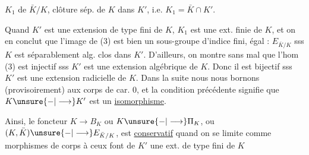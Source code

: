 $K_1$ de $\bar K/K$, clôture  sép. de $K$ dans $K'$, i.e. $K_1=\bar K\cap K'$.

Quand $K'$ est une extension de type fini de $K$, $K_1$ est une ext. finie de $K$, et on en conclut que l'image de (3) est bien un sous-groupe d'indice fini, égal : $E_{\bar K/K}$ sss  $K$ est séparablement alg. clos dans $K'$. D'ailleurs, on montre sans mal que  l'hom (3) est injectif sss $K'$ est une extension algébrique de $K$. Donc il est bijectif sss $K'$ est une extension radicielle de $K$. Dans la suite nous nous bornons (provisoirement) aux corps de car. $0$, et la condition précédente signifie  que $K\unsure{-|\longrightarrow}K'$ est un \uline{isomorphisme}.

Ainsi, le foncteur $K\longrightarrow B_K$ ou $K\unsure{-|\longrightarrow}\Pi_K$, ou $(K,\bar K)\unsure{-|\longrightarrow}E_{\bar K/K}$, est \uline{conservatif} quand on se limite comme morphismes de corps  à ceux   font de $K'$ une ext. de type fini de $K$
